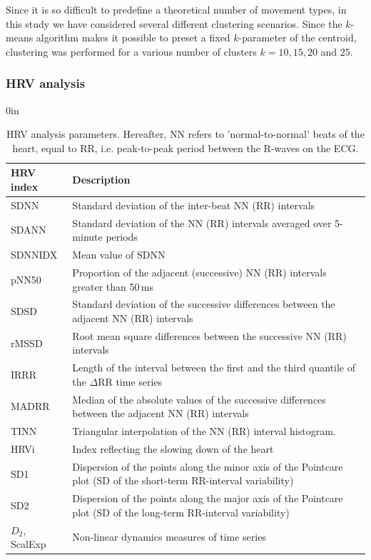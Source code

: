 \documentclass[twocolumn]{svjour3}
\begin{document}

Since it is so difficult to predefine a theoretical number of movement types, in this study we have considered several different clustering scenarios. Since the $k$-means algorithm makes it possible to preset a fixed $k$-parameter of the centroid, clustering was performed for a various number of clusters $k = 10, 15, 20$ and $25$.

\subsubsection{HRV analysis}

\begin{table}[ht]
\begin{adjustwidth}{}{0in}
\caption{HRV analysis parameters. Hereafter, NN refers to 'normal-to-normal' beats of the heart, equal to RR, i.e. peak-to-peak period between the R-waves on the ECG.}
\label{tab:hrv_ann}
\begin{tabular}{lp{}}
\hline
HRV index & Description \\
\hline
SDNN & Standard deviation of the inter-beat NN (RR) intervals \\
SDANN & Standard deviation of the NN (RR) intervals averaged over 5-minute periods \\
SDNNIDX & Mean value of SDNN \\
pNN50 & Proportion of the adjacent (successive) NN (RR) intervals greater than 50\,ms \\
SDSD & Standard deviation of the successive differences between the adjacent NN (RR) intervals \\
rMSSD & Root mean square differences between the successive NN (RR) intervals \\
IRRR & Length of the interval between the first and the third quantile of the $\Delta$RR time series \\
MADRR & Median of the absolute values of the successive differences between the adjacent NN (RR) intervals \\
TINN & Triangular interpolation of the NN (RR) interval histogram. \\
HRVi & Index reflecting the slowing down of the heart \\
SD1 & Dispersion of the points along the minor axis of the Pointcare plot (SD of the short-term RR-interval variability) \\
SD2 & Dispersion of the points along the major axis of the Pointcare plot (SD of the long-term RR-interval variability)\\
$D_2$, ScalExp & Non-linear dynamics measures of time series \\
\hline
\end{tabular}
\end{adjustwidth}
\end{table}
\end{document}
